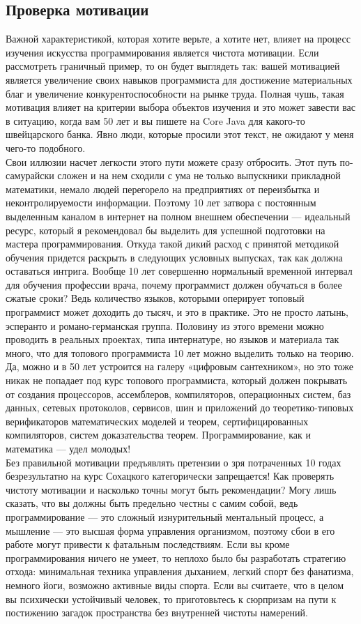 \subsection{Проверка мотивации}

Важной характеристикой, которая хотите верьте, а хотите нет, влияет на процесс изучения искусства программирования является чистота мотивации. Если рассмотреть граничный пример, то он будет выглядеть так: вашей мотивацией является увеличение своих навыков программиста для достижение материальных благ и увеличение конкурентоспособности на рынке труда. Полная чушь, такая мотивация влияет на критерии выбора объектов изучения и это может завести вас в ситуацию, когда вам 50 лет и вы пишете на Core Java для какого-то швейцарского банка. Явно люди, которые просили этот текст, не ожидают у меня чего-то подобного.
\\
Свои иллюзии насчет легкости этого пути можете сразу отбросить. Этот путь по-самурайски сложен и на нем сходили с ума не только выпускники прикладной математики, немало людей перегорело на предприятиях от переизбытка и неконтролируемости информации. Поэтому 10 лет затвора с постоянным выделенным каналом в интернет на полном внешнем обеспечении — идеальный ресурс, который я рекомендовал бы выделить для успешной подготовки на мастера программирования. Откуда такой дикий расход с принятой методикой обучения придется раскрыть в следующих условных выпусках, так как должна оставаться интрига. Вообще 10 лет совершенно нормальный временной интервал для обучения профессии врача, почему программист должен обучаться в более сжатые сроки? Ведь количество языков, которыми оперирует топовый программист может доходить до тысяч, и это в практике. Это не просто латынь, эсперанто и романо-германская группа. Половину из этого времени можно проводить в реальных проектах, типа интернатуре, но языков и материала так много, что для топового программиста 10 лет можно выделить только на теорию.
\\
Да, можно и в 50 лет устроится на галеру «цифровым сантехником», но это тоже никак не попадает под курс топового программиста, который должен покрывать от создания процессоров, ассемблеров, компиляторов, операционных систем, баз данных, сетевых протоколов, сервисов, шин и приложений до теоретико-типовых верификаторов математических моделей и теорем, сертифицированных компиляторов, систем доказательства теорем. Программирование, как и математика — удел молодых!
\\
Без правильной мотивации предъявлять претензии о зря потраченных 10 годах безрезультатно на курс Сохацкого категорически запрещается! Как проверять чистоту мотивации и насколько точны могут быть рекомендации? Могу лишь сказать, что вы должны быть предельно честны с самим собой, ведь программирование — это сложный изнурительный ментальный процесс, а мышление — это высшая форма управления организмом, поэтому сбои в его работе могут привести к фатальным последствиям. Если вы кроме программирования ничего не умеет, то неплохо было бы разработать стратегию отхода: минимальная техника управления дыханием, легкий спорт без фанатизма, немного йоги, возможно активные виды спорта. Если вы считаете, что в целом вы психически устойчивый человек, то приготовьтесь к сюрпризам на пути к постижению загадок пространства без внутренней чистоты намерений.
